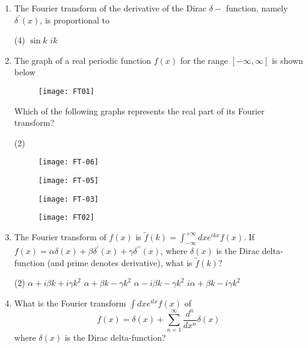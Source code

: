 \begin{enumerate}

\item The Fourier transform of the derivative of the Dirac $\delta-$ function, namely $\delta^{\prime}(x)$, is proportional to
{}

\begin{tasks}(4)
\task[\textbf{C.}] $\sin k$
\task[\textbf{D.}] $i k$
\end{tasks}
\item 
	The graph of a real periodic function $f(x)$ for the range $[-\infty, \infty]$ is shown below {}
	\begin{figure}[H]
		\centering
		\texttt{[image: FT01]}
	\end{figure}
	Which of the following graphs represents the real part of its Fourier transform?
	\begin{tasks}(2)
		\task[\textbf{A.}]
		\begin{figure}[H]
			\centering
			\texttt{[image: FT-06]}
		\end{figure}
		\task[\textbf{B.}]	\begin{figure}[H]
			\centering
			\texttt{[image: FT-05]}
		\end{figure}
		\task[\textbf{C.}]	\begin{figure}[H]
			\centering
			\texttt{[image: FT-03]}
		\end{figure}
		\task[\textbf{D.}] 	\begin{figure}[H]
			\centering
			\texttt{[image: FT02]}
		\end{figure}
	\end{tasks}
\item The Fourier transform of $f(x)$ is $\tilde{f}(k)=\int_{-\infty}^{+\infty} d x e^{i k x} f(x)$.
If $f(x)=\alpha \delta(x)+\beta \delta^{\prime}(x)+\gamma \delta^{\prime \prime}(x)$, where $\delta(x)$ is the Dirac delta-function (and prime denotes derivative), what is $\tilde{f}(k) ?$
{}

\begin{tasks}(2)
\task[\textbf{A.}] $\alpha+i \beta k+i \gamma k^{2}$
\task[\textbf{B.}] $\alpha+\beta k-\gamma k^{2}$
\task[\textbf{C.}]  $\alpha-i \beta k-\gamma k^{2}$
\task[\textbf{D.}] $i \alpha+\beta k-i \gamma k^{2}$
\end{tasks}
\item What is the Fourier transform $\int d x e^{i l x} f(x)$ of
$$
f(x)=\delta(x)+\sum_{n=1}^{\infty} \frac{d^{n}}{d x^{n}} \delta(x)
$$
where $\delta(x)$ is the Dirac delta-function?
{}


\end{enumerate}
